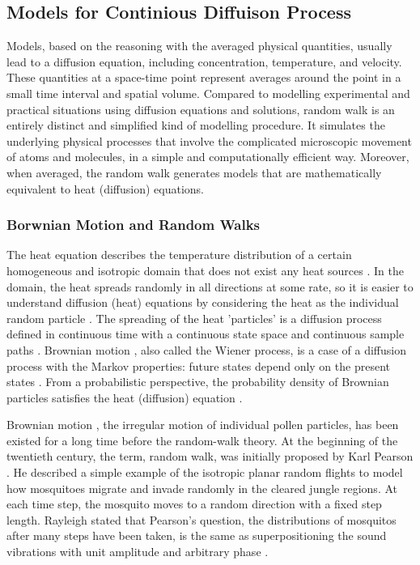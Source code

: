 \subsection{Models for Continious Diffuison Process}

Models, based on the reasoning with the averaged physical quantities,
usually lead to a diffusion equation, including concentration,
temperature, and velocity. These quantities at a space-time point
represent averages around the point in a small time interval and
spatial volume. Compared to modelling experimental and practical
situations using diffusion equations and solutions, random walk is
an entirely distinct and simplified kind of modelling procedure. It
simulates the underlying physical processes that involve the
complicated microscopic movement of atoms and molecules, in a simple
and computationally efficient way. Moreover, when averaged, the random
walk generates models that are mathematically equivalent to heat
(diffusion) equations.

\subsubsection{Borwnian Motion and Random Walks}

The heat equation describes the temperature distribution of a certain
homogeneous and isotropic domain that does not exist any heat sources
\cite{varadhan1980lectures}. In the domain, the heat spreads randomly
in all directions at some rate, so it is easier to understand
diffusion (heat) equations by considering the heat as the individual
random particle \cite{lawler2010random}. The spreading of the heat 'particles' is a diffusion process defined in continuous time with a
continuous state space and continuous sample paths
\cite{ito2012diffusion}. Brownian motion
\cite{brown1828microscopical}, also called the Wiener process, is a
case of a diffusion process with the Markov properties: future states
depend only on the present states \cite{bharucha2012elements}. From a
probabilistic perspective, the probability density of Brownian
particles satisfies the heat (diffusion) equation
\cite{kac1947random}\cite{varadhan1980lectures}.



Brownian motion \cite{brown1828microscopical}, the irregular motion of
individual pollen particles, has been existed for a long time before
the random-walk theory. At the beginning of the twentieth century, the
term, random walk, was initially proposed by Karl Pearson
\cite{pearson1905problem}. He described a simple example of the
isotropic planar random flights to model how mosquitoes migrate and
invade randomly in the cleared jungle regions. At each time step, the
mosquito moves to a random direction with a fixed step
length. Rayleigh \cite{rayleigh1905problem} stated that Pearson's
question, the distributions of mosquitos after many steps have been
taken, is the same as superpositioning the sound vibrations with unit
amplitude and arbitrary phase \cite{de2012flying}.


